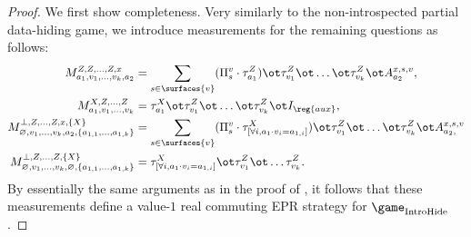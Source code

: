   \begin{proof}
    We first show completeness. Very similarly to the non-introspected
    partial data-hiding game, we introduce measurements for the
    remaining questions as follows:
    \begin{align*}
      M^{Z, Z, \dots, Z, x}_{a_1, v_1, \dots, v_k, a_2} &= \sum_{s \in
                                                          \surfaces{v}}
                                                          (\Pi^{v}_s \cdot
                                                          \tau^Z_{a_1})
                                                          \ot
                                                          \tau^Z_{v_1}
                                                          \ot \dots
                                                          \ot
                                                          \tau^Z_{v_k}
                                                          \ot
                                                          A^{x,s,v}_{a_2},
      \\
      M^{X, Z, \dots, Z}_{a_1, v_1, \dots, v_k} &= \tau^X_{a_1} \ot
                                                  \tau^Z_{v_1} \ot
                                                  \dots \ot
                                                  \tau^Z_{v_k} \ot I_{\reg{aux}},\\
      M^{\bot, Z, \dots, Z, x, \{X\}}_{\varnothing, v_1, \dots, v_k,
      a_2, \{a_{1,1}, \dots, a_{1,k}\}} &= \sum_{s \in \surfaces{v}}
                                         ( \Pi^{v}_s \cdot \tau^X_{[\forall
                                          i,  a_1 \cdot v_i = a_{1, i}]})
                                          \ot \tau^Z_{v_1} \ot \dots
                                          \ot \tau^Z_{v_k} \ot
                                          A^{x,s,v}_{a_2,} \\
      M^{\bot, Z, \dots, Z, \{X\}}_{\varnothing, v_1, \dots, v_k,
      \varnothing, \{a_{1,1}, \dots, a_{1,k}\}} &=\tau^X_{[\forall i,
                                                  a_1 \cdot v_i = a_{1,i}]} \ot \tau^Z_{v_1}
                                                  \ot \dots
                                                  \tau^Z_{v_k} .
    \end{align*}
    By essentially the same arguments as in the proof of , it
    follows that these measurements define a value-$1$ real commuting
    EPR strategy for $\game_{\mathrm{IntroHide}}$.


\end{proof}
